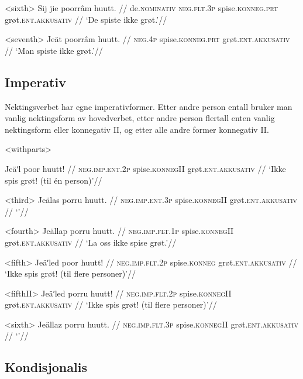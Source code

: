 \a<sixth>
\begingl %
\gla Sij jie poorrâm huutt. //
\glb de.\textsc{nominativ} \textsc{neg.flt.3p} spise.\textsc{konneg.prt} grøt.\textsc{ent.akkusativ} //
\glft `De spiste ikke grøt.'//
\endgl

\a<seventh>
\begingl %
\gla Jeät poorrâm huutt. //
\glb \textsc{neg.4p} spise.\textsc{konneg.prt} grøt.\textsc{ent.akkusativ} //
\glft `Man spiste ikke grøt.'//
\endgl

\xe

\subsection{Imperativ}

Nektingsverbet har egne imperativformer. Etter andre person entall bruker man vanlig nektingsform av hovedverbet, etter andre person flertall enten vanlig nektingsform eller konnegativ II, og etter alle andre former konnegativ II.

\pex<withparts> %

\begingl %
\gla Jeäʹl poor huutt! //
\glb \textsc{neg.imp.ent.2p} spise.\textsc{konnegII} grøt.\textsc{ent.akkusativ} //
\glft `Ikke spis grøt! (til én person)'//
\endgl

\a<third>
\begingl %
\gla Jeälas porru huutt. //
\glb \textsc{neg.imp.ent.3p} spise.\textsc{konnegII} grøt.\textsc{ent.akkusativ} //
\glft `'//
\endgl

\a<fourth>
\begingl %
\gla Jeällap porru huutt. //
\glb \textsc{neg.imp.flt.1p} spise.\textsc{konnegII} grøt.\textsc{ent.akkusativ} //
\glft `La oss ikke spise grøt.'//
\endgl

\a<fifth>
\begingl %
\gla Jeäʹled poor huutt! //
\glb \textsc{neg.imp.flt.2p} spise.\textsc{konneg} grøt.\textsc{ent.akkusativ} //
\glft `Ikke spis grøt! (til flere personer)'//
\endgl

\a<fifthII>
\begingl %
\gla Jeäʹled porru huutt! //
\glb \textsc{neg.imp.flt.2p} spise.\textsc{konnegII} grøt.\textsc{ent.akkusativ} //
\glft `Ikke spis grøt! (til flere personer)'//
\endgl

\a<sixth>
\begingl %
\gla Jeällaz porru huutt. //
\glb \textsc{neg.imp.flt.3p} spise.\textsc{konnegII} grøt.\textsc{ent.akkusativ} //
\glft `'//
\endgl

\xe

\subsection{Kondisjonalis}


